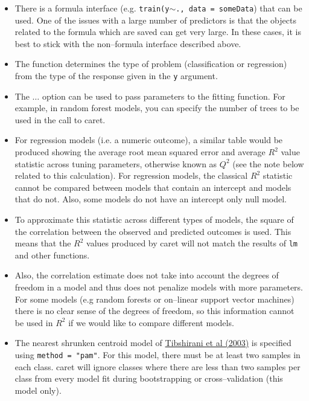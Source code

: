 \documentclass[12pt]{article}
\newcommand{\code}[1]{\mbox{\footnotesize\color{darkblue}\texttt{#1}}}
\newcommand{\pkg}[1]{{\fontseries{b}\selectfont #1}}
\renewcommand{\pkg}[1]{{\textsf{#1}}}
\begin{document}
\begin{itemize}
  
\item There is a formula interface (e.g. \code{train(y$\sim$., data =
    someData}) that can be used. One of the issues with a large
  number of predictors is that the objects related to the formula
  which are saved can get very large. In these cases, it is best to
  stick with the non--formula interface described above. 
  
\item The function determines the type of problem
  (classification or regression) from the type of the response
  given in the \code{y} argument.  
  
\item The \code{$\ldots$} option can be used to pass
  parameters to the fitting function. For example, in random
  forest models, you can specify the number of trees to be
  used in the call to \pkg{caret}. 
  
\item For regression models (i.e. a numeric outcome), a similar table would
be produced showing the average root mean squared error and average
$R^2$ value statistic across tuning parameters, otherwise known as
$Q^2$ (see the note below related to this calculation).
For regression models, the classical $R^2$ statistic
  cannot be compared between models that contain an intercept
  and models that do not. Also, some models do not have an
  intercept only null model.	 
  
\item [] To approximate this statistic across different
  types of models,  the square of the correlation between
  the observed and predicted outcomes is used. This means
  that the $R^2$ values produced by \pkg{caret} will not
  match the results of \code{lm} and other functions.  
  
\item [] Also, the correlation estimate does not take into
  account the degrees of freedom in a model and thus does
  not penalize models with more parameters. For some
  models (e.g random forests or on--linear support vector
  machines) there is no clear sense of the degrees of
  freedom, so this information cannot be used in $R^2$ if
  we would like to compare different models. 
  
  
\item The nearest shrunken centroid model of
  \href{http://projecteuclid.org/handle/euclid.ss/1056397488}{Tibshirani
    et al (2003)} is specified using \code{method =
    "pam"}. For this model, there must be at least two samples
  in each class. \pkg{caret} will ignore classes where
  there are less than two samples per class from every model
  fit during bootstrapping or cross--validation (this model
  only). 
  

\end{itemize}
\end{document}
